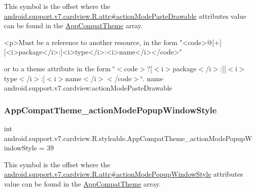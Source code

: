 This symbol is the offset where the \hyperlink{classandroid_1_1support_1_1v7_1_1cardview_1_1R_1_1attr_ac766dac9eccbe79b90d7776b8f7c2b26}{android.\+support.\+v7.\+cardview.\+R.\+attr\#action\+Mode\+Paste\+Drawable} attribute\textquotesingle{}s value can be found in the \hyperlink{classandroid_1_1support_1_1v7_1_1cardview_1_1R_1_1styleable_a52e6f69f954ecc2622d72c0b4d298938}{App\+Compat\+Theme} array.

\begin{DoxyVerb}      <p>Must be a reference to another resource, in the form "<code>@[+][<i>package</i>:]<i>type</i>:<i>name</i></code>"
\end{DoxyVerb}
 or to a theme attribute in the form \char`\"{}$<$code$>$?\mbox{[}$<$i$>$package$<$/i$>$\+:\mbox{]}\mbox{[}$<$i$>$type$<$/i$>$\+:\mbox{]}$<$i$>$name$<$/i$>$$<$/code$>$\char`\"{}.  name android.\+support.\+v7.\+cardview\+:action\+Mode\+Paste\+Drawable \mbox{\label{classandroid_1_1support_1_1v7_1_1cardview_1_1R_1_1styleable_aa231285ac74ab42e147ca4b9661753bf}} 
\subsubsection{\texorpdfstring{App\+Compat\+Theme\+\_\+action\+Mode\+Popup\+Window\+Style}{AppCompatTheme\_actionModePopupWindowStyle}}
{\footnotesize\ttfamily int android.\+support.\+v7.\+cardview.\+R.\+styleable.\+App\+Compat\+Theme\+\_\+action\+Mode\+Popup\+Window\+Style = 39\hspace{0.3cm}{\ttfamily [static]}}

This symbol is the offset where the \hyperlink{classandroid_1_1support_1_1v7_1_1cardview_1_1R_1_1attr_a5b58730faf2ff2f5aba8da289ef2570b}{android.\+support.\+v7.\+cardview.\+R.\+attr\#action\+Mode\+Popup\+Window\+Style} attribute\textquotesingle{}s value can be found in the \hyperlink{classandroid_1_1support_1_1v7_1_1cardview_1_1R_1_1styleable_a52e6f69f954ecc2622d72c0b4d298938}{App\+Compat\+Theme} array.

